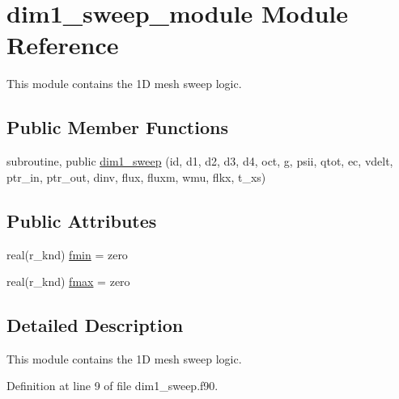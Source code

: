 \hypertarget{classdim1__sweep__module}{\section{dim1\-\_\-sweep\-\_\-module Module Reference}
\label{classdim1__sweep__module}
}


This module contains the 1\-D mesh sweep logic.  


\subsection*{Public Member Functions}
\begin{DoxyCompactItemize}
\item 
subroutine, public \hyperlink{classdim1__sweep__module_aa0a270b2504bf7da636d3b3eaecdea16}{dim1\-\_\-sweep} (id, d1, d2, d3, d4, oct, g, psii, qtot, ec, vdelt, ptr\-\_\-in, ptr\-\_\-out, dinv, flux, fluxm, wmu, flkx, t\-\_\-xs)
\end{DoxyCompactItemize}
\subsection*{Public Attributes}
\begin{DoxyCompactItemize}
\item 
real(r\-\_\-knd) \hyperlink{classdim1__sweep__module_a9b0ce6702181b5c9bf98ac179929a1aa}{fmin} = zero
\item 
real(r\-\_\-knd) \hyperlink{classdim1__sweep__module_a973f03dda9d8fe7662d437c0c790f3a2}{fmax} = zero
\end{DoxyCompactItemize}


\subsection{Detailed Description}
This module contains the 1\-D mesh sweep logic. 

Definition at line 9 of file dim1\-\_\-sweep.\-f90.



